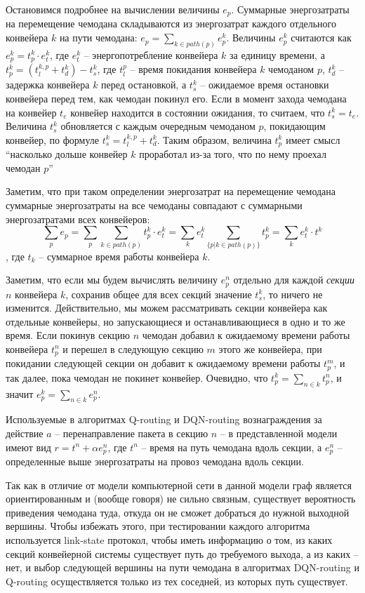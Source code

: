 \documentclass[specification, annotation]{itmo-student-thesis}
\begin{document}
Остановимся подробнее на вычислении величины $e_p$. Суммарные энергозатраты на
перемещение чемодана складываются из энергозатрат каждого отдельного конвейера
$k$ на пути чемодана: $e_p = \sum\limits_{k \in path(p)} {e_p^k}$.
Величины $e_p^k$ считаются как $e_p^k = t_p^k \cdot e_t^k$, где $e_t^k$ --
энергопотребление конвейера $k$ за единицу времени, а
$t_p^k = (t_l^{k,p} + t_d^k) - t_s^k$, где $t_l^p$ -- время покидания конвейера $k$
чемоданом $p$, $t_d^k$ -- задержка конвейера $k$ перед остановкой, а $t_s^k$ --
ожидаемое время остановки конвейера перед тем, как чемодан покинул его. Если в
момент захода чемодана на конвейер $t_e$ конвейер находится в состоянии
ожидания, то считаем, что $t_s^k = t_e$. Величина $t_s^k$ обновляется с каждым
очередным чемоданом $p$, покидающим конвейер, по формуле
$t_s^k = t_l^{k,p} + t_d^k$. Таким образом, величина $t_p^k$ имеет смысл
\enquote{насколько дольше конвейер $k$ проработал из-за того, что по нему проехал
чемодан $p$}

Заметим, что при таком определении энергозатрат на перемещение чемодана
суммарные энергозатраты на все чемоданы совпадают с суммарными энергозатратами
всех конвейеров:
\[
\sum\limits_p {e_p} = \sum\limits_p {\sum\limits_{k \in path(p)} {t_p^k \cdot
    e_t^k}} = \sum\limits_k {e_t^k \sum\limits_{\{p | k \in path(p)\}} {t_p^k}}
= \sum\limits_k {e_t^k \cdot t^k} 
\],
где $t_k$ -- суммарное время работы конвейера $k$.

Заметим, что если мы будем вычислять величину $e_p^n$ отдельно для каждой
\textit{секции} $n$ конвейера $k$, сохранив общее для всех секций значение
$t_s^k$, то ничего не изменится. Действительно, мы можем рассматривать секции
конвейера как отдельные конвейеры, но запускающиеся и останавливающиеся в одно и
то же время. Если покинув секцию $n$ чемодан добавил к ожидаемому времени работы
конвейера $t_p^n$ и перешел в следующую секцию $m$ этого же конвейера, при покидании
следующей секции он добавит к ожидаемому времени работы $t_p^m$, и так далее,
пока чемодан не покинет конвейер. Очевидно, что $t_p^k = \sum_{n \in k} t_p^n$,
и значит $e_p^k = \sum_{n \in k} e_p^n$. 

Используемые в алгоритмах Q-routing и DQN-routing вознаграждения за действие $a$
-- перенаправление пакета в секцию $n$ -- в представленной модели имеют вид
$r =t^n + \alpha e_p^n$, где $t^n$ -- время на путь чемодана вдоль секции, а $e_p^n$
-- определенные выше энергозатраты на провоз чемодана вдоль секции.

Так как в отличие от модели компьютерной сети в данной модели граф является
ориентированным и (вообще говоря) не сильно связным, существует вероятность
приведения чемодана туда, откуда он не сможет добраться до нужной выходной
вершины. Чтобы избежать этого, при тестировании каждого алгоритма
используется link-state протокол, чтобы иметь информацию о том, из каких секций
конвейерной системы существует путь до требуемого выхода, а из каких -- нет, и
выбор следующей вершины на пути чемодана в алгоритмах DQN-routing и Q-routing
осуществляется только из тех соседней, из которых путь существует.
\end{document}
